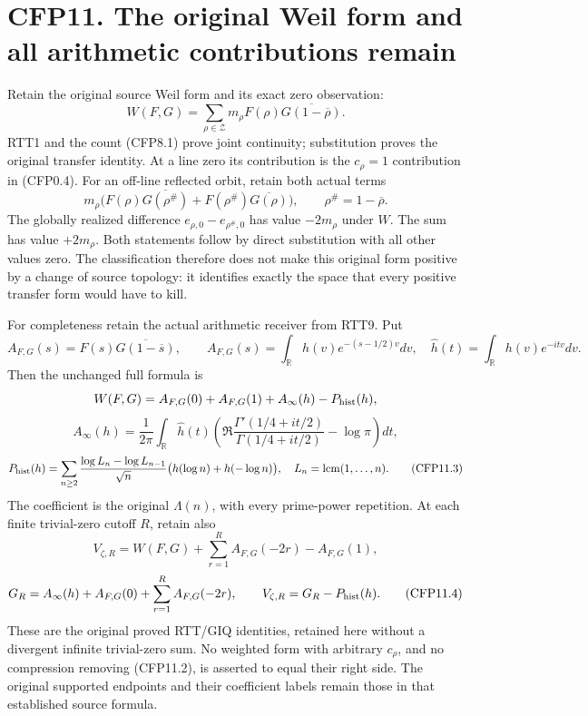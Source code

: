 \section{CFP11. The original Weil form and all arithmetic contributions
remain}\label{cfp11.-the-original-weil-form-and-all-arithmetic-contributions-remain}

Retain the original source Weil form and its exact zero observation: \[
W(F,G)=\sum_{\rho\in\mathscr Z}m_\rho
F(\rho)\overline{G(1-\overline\rho)}.
\tag{CFP11.1}
\] RTT1 and the count (CFP8.1) prove joint continuity; substitution
proves the original transfer identity. At a line zero its contribution
is the \(c_\rho=1\) contribution in (CFP0.4). For an off-line reflected
orbit, retain both actual terms \[
m_\rho\bigl(F(\rho)\overline{G(\rho^\#)}
+F(\rho^\#)\overline{G(\rho)}\bigr),
\qquad \rho^\#=1-\overline\rho.
\tag{CFP11.2}
\] The globally realized difference \(e_{\rho,0}-e_{\rho^\#,0}\) has
value \(-2m_\rho\) under \(W\). The sum has value \(+2m_\rho\). Both
statements follow by direct substitution with all other values zero. The
classification therefore does not make this original form positive by a
change of source topology: it identifies exactly the space that every
positive transfer form would have to kill.

For completeness retain the actual arithmetic receiver from RTT9. Put \[
A_{F,G}(s)=F(s)\overline{G(1-\overline s)},\qquad
A_{F,G}(s)=\int_{\mathbb R}h(v)e^{-(s-1/2)v}dv,
\quad\widehat h(t)=\int_{\mathbb R}h(v)e^{-itv}dv.
\] Then the unchanged full formula is \[
W(F,G)=A_{F,G}(0)+A_{F,G}(1)+A_\infty(h)-P_{\rm hist}(h),
\] \[
A_\infty(h)=\frac1{2\pi}\int_{\mathbb R}\widehat h(t)
\left(\Re\frac{\Gamma'(1/4+it/2)}{\Gamma(1/4+it/2)}-\log\pi\right)dt,
\] \[
P_{\rm hist}(h)=\sum_{n\ge2}
\frac{\log L_n-\log L_{n-1}}{\sqrt n}
\bigl(h(\log n)+h(-\log n)\bigr),\quad
L_n=\operatorname{lcm}(1,\ldots,n).
\tag{CFP11.3}
\] The coefficient is the original \(\Lambda(n)\), with every
prime-power repetition. At each finite trivial-zero cutoff \(R\), retain
also \[
V_{\zeta,R}=W(F,G)+\sum_{r=1}^RA_{F,G}(-2r)-A_{F,G}(1),
\] \[
G_R=A_\infty(h)+A_{F,G}(0)+\sum_{r=1}^RA_{F,G}(-2r),
\qquad V_{\zeta,R}=G_R-P_{\rm hist}(h).
\tag{CFP11.4}
\] These are the original proved RTT/GIQ identities, retained here
without a divergent infinite trivial-zero sum. No weighted form with
arbitrary \(c_\rho\), and no compression removing (CFP11.2), is asserted
to equal their right side. The original supported endpoints and their
coefficient labels remain those in that established source formula.

